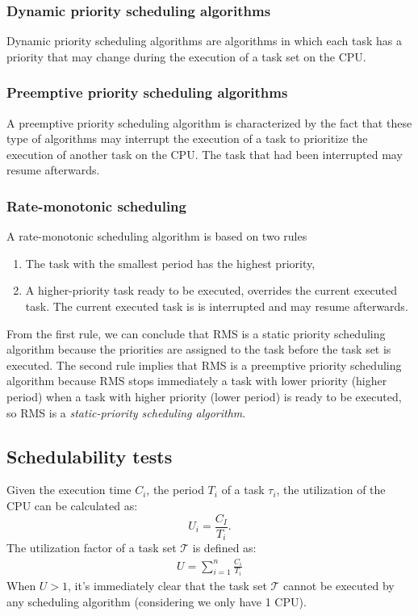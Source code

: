 \documentclass[a4paper,12pt]{article}
\theoremstyle{definition}
\newcommand{\Tau}{\mathcal{T}}
\begin{document}
\subsubsection{Dynamic priority scheduling algorithms}
Dynamic priority scheduling algorithms are algorithms in which each task has a 
priority that may change during the execution of a task set on the CPU. 
\subsubsection{Preemptive priority scheduling algorithms}
A preemptive priority scheduling algorithm is characterized by the fact that 
these type of algorithms may interrupt the execution of a task to prioritize the 
execution of another task on the CPU. The task that had been interrupted may resume afterwards.  

\subsubsection{Rate-monotonic scheduling}
A rate-monotonic scheduling algorithm is based on two rules
\begin{enumerate}
  \item The task with the smallest period has the highest priority,
  \item A higher-priority task ready to be executed, overrides the current 
  executed task. The current executed task is is interrupted and may resume 
  afterwards.
\end{enumerate}
From the first rule, we can conclude that RMS is a static priority scheduling 
algorithm because the priorities are assigned to the task before the task set is 
executed. The second rule implies that RMS is a preemptive priority scheduling 
algorithm because RMS stops immediately a task with lower priority (higher period) when a task 
with higher priority (lower period) is ready to be executed, so RMS is a \emph{static-priority scheduling 
algorithm}.
\subsection{Schedulability tests}
Given the execution time $C_i$, the period $T_i$ of a task $\tau_i$, the 
utilization of the CPU can be calculated as:
$$U_i = \frac{C_I}{T_i}.$$
The utilization factor of a task set $\Tau$ is defined as:
\begin{eqnarray}
  U = \sum\limits_{i=1}^{n} \frac{C_i}{T_i}
\end{eqnarray}
When  $U> 1$, it's immediately clear that the task set $\Tau$ cannot be 
executed by any scheduling algorithm (considering we only have 1 CPU).
\end{document}
